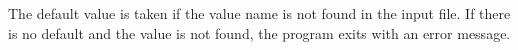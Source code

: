 The default value is taken if the value name is not found in the input file. If there is no default and
the value is not found,
the program exits with an error message.





